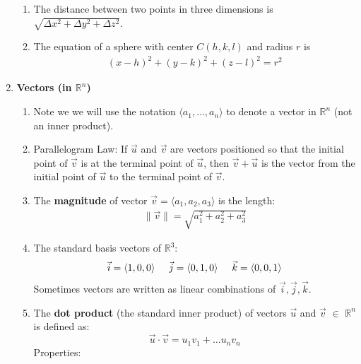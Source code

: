 \documentclass[10pt]{article}
\begin{document}
\begin{multicols}{2}
\begin{enumerate}
\begin{enumerate}
        
        \item The distance between two points in three dimensions is $\sqrt{\Delta x^2 + \Delta y^2 + \Delta z^2}$.
        \item The equation of a sphere with center $C(h,k,l)$ and radius $r$ is 
        \begin{align*}
            (x-h)^2 + (y-k)^2 + (z-l)^2 = r^2
        \end{align*}
    \end{enumerate}
    \item \textbf{Vectors (in $\mathbb{R}^n$)}
    \begin{enumerate}
        \item Note we we will use the notation $\langle a_1, \hdots, a_n \rangle$ to denote a vector in $\mathbb{R}^n$ (not an inner product).
        \item Parallelogram Law: If $\vec{u}$ and $\vec{v}$ are vectors positioned so that the initial point of $\vec{v}$ is at the terminal point of $\vec{u}$, then $\vec{v} + \vec{u}$ is the vector from the initial point of $\vec{u}$ to the terminal point of $\vec{v}$.
        \item The \textbf{magnitude} of vector $\vec{v} = \langle a_1, a_2, a_3 \rangle$ is the length: 
        \begin{align*}
            \| \vec{v} \| = \sqrt{a_1^2 + a_2^2 + a_3^2}
        \end{align*}
        \item The standard basis vectors of $\mathbb{R}^3$:
        \begin{align*}
            \vec{i} = \langle 1,0,0 \rangle \hspace{5mm} 
            \vec{j} = \langle 0,1,0 \rangle \hspace{5mm} 
            \vec{k} = \langle 0,0,1 \rangle 
        \end{align*}
        Sometimes vectors are written as linear combinations of $\vec{i},\vec{j},\vec{k}$.
    \item The \textbf{dot product} (the standard inner product) of vectors $\vec{u}$ and $\vec{v}$ $\in$ $\mathbb{R}^n$ is defined as:
    \begin{equation*}
       \vec{u} \cdot \vec{v} = u_1v_1+\ldots u_nv_n
    \end{equation*}
    Properties:
    \begin{align*}

\end{align*}
\end{enumerate}
\end{enumerate}
\end{multicols}
\end{document}
